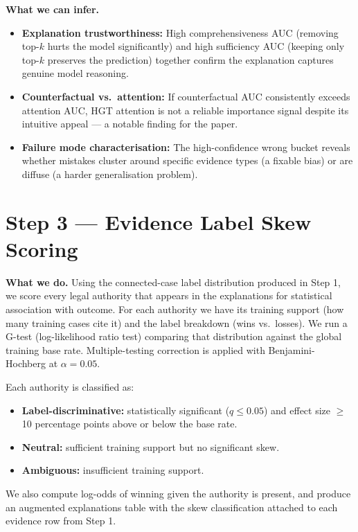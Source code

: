 \documentclass[11pt,a4paper]{article}
\begin{document}
\textbf{What we can infer.}
\begin{itemize}
  \item \textbf{Explanation trustworthiness:} High comprehensiveness AUC (removing
    top-$k$ hurts the model significantly) and high sufficiency AUC (keeping only
    top-$k$ preserves the prediction) together confirm the explanation captures
    genuine model reasoning.
  \item \textbf{Counterfactual vs.\ attention:} If counterfactual AUC consistently
    exceeds attention AUC, HGT attention is not a reliable importance signal despite
    its intuitive appeal --- a notable finding for the paper.
  \item \textbf{Failure mode characterisation:} The high-confidence wrong bucket
    reveals whether mistakes cluster around specific evidence types (a fixable bias)
    or are diffuse (a harder generalisation problem).
\end{itemize}

\bigskip

\section{Step 3 \texorpdfstring{\textcolor{stepgray}{---}}{---} Evidence Label Skew Scoring}

\textbf{What we do.}
Using the connected-case label distribution produced in Step 1, we score every
legal authority that appears in the explanations for statistical association with
outcome. For each authority we have its training support (how many training cases
cite it) and the label breakdown (wins vs.\ losses). We run a G-test
(log-likelihood ratio test) comparing that distribution against the global training
base rate. Multiple-testing correction is applied with Benjamini-Hochberg at
$\alpha = 0.05$.

Each authority is classified as:
\begin{itemize}
  \item \textbf{Label-discriminative:} statistically significant ($q \leq 0.05$)
    and effect size $\geq$10 percentage points above or below the base rate.
  \item \textbf{Neutral:} sufficient training support but no significant skew.
  \item \textbf{Ambiguous:} insufficient training support.
\end{itemize}
We also compute log-odds of winning given the authority is present, and produce an
augmented explanations table with the skew classification attached to each evidence
row from Step 1.
\end{document}
